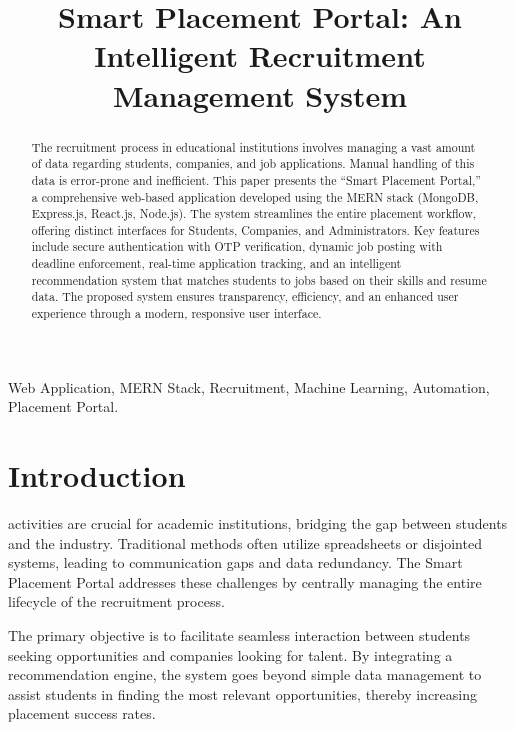 \documentclass[conference]{IEEEtran}
\begin{document}
\title{Smart Placement Portal: An Intelligent Recruitment Management System\\
}

\author{
}

\maketitle

\begin{abstract}
The recruitment process in educational institutions involves managing a vast amount of data regarding students, companies, and job applications. Manual handling of this data is error-prone and inefficient. This paper presents the ``Smart Placement Portal,'' a comprehensive web-based application developed using the MERN stack (MongoDB, Express.js, React.js, Node.js). The system streamlines the entire placement workflow, offering distinct interfaces for Students, Companies, and Administrators. Key features include secure authentication with OTP verification, dynamic job posting with deadline enforcement, real-time application tracking, and an intelligent recommendation system that matches students to jobs based on their skills and resume data. The proposed system ensures transparency, efficiency, and an enhanced user experience through a modern, responsive user interface.
\end{abstract}

\begin{IEEEkeywords}
Web Application, MERN Stack, Recruitment, Machine Learning, Automation, Placement Portal.
\end{IEEEkeywords}

\section{Introduction}
 activities are crucial for academic institutions, bridging the gap between students and the industry. Traditional methods often utilize spreadsheets or disjointed systems, leading to communication gaps and data redundancy. The Smart Placement Portal addresses these challenges by centrally managing the entire lifecycle of the recruitment process.

The primary objective is to facilitate seamless interaction between students seeking opportunities and companies looking for talent. By integrating a recommendation engine, the system goes beyond simple data management to assist students in finding the most relevant opportunities, thereby increasing placement success rates.
\end{document}
